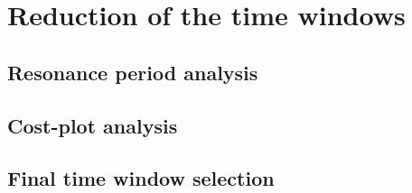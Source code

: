 \section{Reduction of the time windows}
\label{sec:time_red}

\subsection{Resonance period analysis}
\label{subsec:res_period}

\subsection{Cost-plot analysis}
\label{subsec:cost_plot_analysis}

\subsection{Final time window selection}
\label{subsec:final_window}